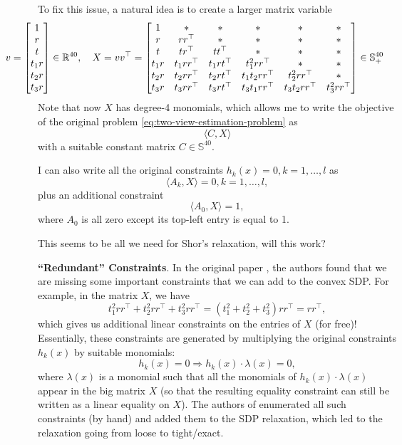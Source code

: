 \documentclass[
]{book}
\theoremstyle{definition}
\theoremstyle{definition}
\theoremstyle{definition}
\theoremstyle{definition}
\theoremstyle{remark}
\begin{document}
To fix this issue, a natural idea is to create a larger matrix variable
\begin{equation}
\hspace{-16mm}
v = \begin{bmatrix} 
1 \\ r \\ t \\ t_1 r \\ t_2 r \\ t_3 r \end{bmatrix} \in \mathbb{R}^{40}, \quad X = vv^\top= \begin{bmatrix} 1 & * & * & * & * & * \\
r & rr^\top& * & * & * & * \\
t & tr^\top& tt^\top& * & * & * \\
t_1 r & t_1 rr^\top& t_1 r t^\top& t_1^2 rr^\top& * & * \\
t_2 r & t_2 rr^\top& t_2 r t^\top& t_1 t_2 rr^\top& t_2^2 rr^\top& * \\
t_3 r & t_3 rr^\top& t_3 r t^\top& t_3 t_1 rr^\top& t_3 t_2 rr^\top& t_3^2 rr^\top\end{bmatrix} \in \mathbb{S}^{40}_{+}
\label{eq:two-view-larger-X}
\end{equation}
Note that now \(X\) has degree-4 monomials, which allows me to write the objective of the original problem \eqref{eq:two-view-estimation-problem} as
\[
\langle C, X \rangle
\]
with a suitable constant matrix \(C \in \mathbb{S}^{40}\).

I can also write all the original constraints \(h_k(x) = 0,k=1,\dots,l\) as
\[
\langle A_k, X \rangle = 0, k=1,\dots,l,
\]
plus an additional constraint
\[
\langle A_0, X \rangle = 1, 
\]
where \(A_0\) is all zero except its top-left entry is equal to 1.

This seems to be all we need for Shor's relaxation, will this work?

\textbf{``Redundant'' Constraints}. In the original paper \citep{briales18cvpr-certifiably}, the authors found that we are missing some important constraints that we can add to the convex SDP. For example, in the matrix \(X\), we have
\[
t_1^2 rr^\top+ t_2^2 rr^\top+ t_3^2 rr^\top= (t_1^2 + t_2^2 + t_3^2) rr^\top= rr^\top,
\]
which gives us additional linear constraints on the entries of \(X\) (for free)! Essentially, these constraints are generated by multiplying the original constraints \(h_k(x)\) by suitable monomials:
\[
h_k(x) = 0 \Rightarrow h_k(x) \cdot \lambda(x) = 0,
\]
where \(\lambda(x)\) is a monomial such that all the monomials of \(h_k(x) \cdot \lambda(x)\) appear in the big matrix \(X\) (so that the resulting equality constraint can still be written as a linear equality on \(X\)). The authors of \citep{briales18cvpr-certifiably} enumerated all such constraints (by hand) and added them to the SDP relaxation, which led to the relaxation going from loose to tight/exact.
\end{document}
